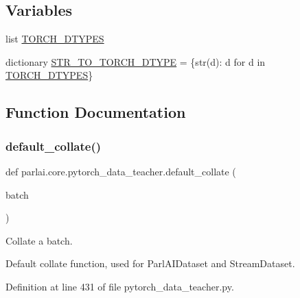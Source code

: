 \subsection*{Variables}
\begin{DoxyCompactItemize}
\item 
list \hyperlink{namespaceparlai_1_1core_1_1pytorch__data__teacher_a70d3594b63522c1d2596bd15f1fb89e0}{T\+O\+R\+C\+H\+\_\+\+D\+T\+Y\+P\+ES}
\item 
dictionary \hyperlink{namespaceparlai_1_1core_1_1pytorch__data__teacher_a34008e5ea53ba69d5da10b59d55abef4}{S\+T\+R\+\_\+\+T\+O\+\_\+\+T\+O\+R\+C\+H\+\_\+\+D\+T\+Y\+PE} = \{str(d)\+: d for d in \hyperlink{namespaceparlai_1_1core_1_1pytorch__data__teacher_a70d3594b63522c1d2596bd15f1fb89e0}{T\+O\+R\+C\+H\+\_\+\+D\+T\+Y\+P\+ES}\}
\end{DoxyCompactItemize}


\subsection{Function Documentation}
\mbox{\label{namespaceparlai_1_1core_1_1pytorch__data__teacher_a7236aa20497f2a598df9b85909901184}} 
\subsubsection{\texorpdfstring{default\+\_\+collate()}{default\_collate()}}
{\footnotesize\ttfamily def parlai.\+core.\+pytorch\+\_\+data\+\_\+teacher.\+default\+\_\+collate (\begin{DoxyParamCaption}\item[{}]{batch }\end{DoxyParamCaption})}

\begin{DoxyVerb}Collate a batch.

Default collate function, used for ParlAIDataset and StreamDataset.
\end{DoxyVerb}
 

Definition at line 431 of file pytorch\+\_\+data\+\_\+teacher.\+py.



